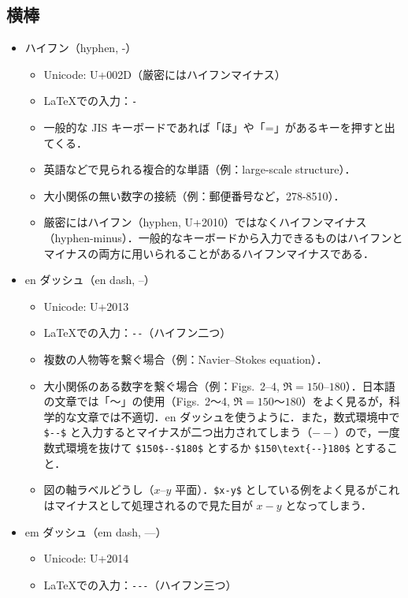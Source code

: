 \subsection*{横棒}

\begin{itemize}
    \item ハイフン（hyphen, -）
    \begin{itemize}
        \item Unicode: U+002D（厳密にはハイフンマイナス）
        \item \LaTeX での入力：\verb|-|
        \item 一般的な JIS キーボードであれば「ほ」や「=」があるキーを押すと出てくる．
        \item 英語などで見られる複合的な単語（例：large-scale structure）．
        \item 大小関係の無い数字の接続（例：郵便番号など，278-8510）．
        \item 厳密にはハイフン（hyphen, U+2010）ではなくハイフンマイナス（hyphen-minus）．一般的なキーボードから入力できるものはハイフンとマイナスの両方に用いられることがあるハイフンマイナスである．
    \end{itemize}
    \item en ダッシュ（en dash, --）
    \begin{itemize}
        \item Unicode: U+2013
        \item \LaTeX での入力：\verb|--|（ハイフン二つ）
        \item 複数の人物等を繋ぐ場合（例：Navier--Stokes equation）．
        \item 大小関係のある数字を繋ぐ場合（例：Figs.~2--4, $\Re = 150$--$180$）．日本語の文章では「～」の使用（Figs.~2～4, $\Re = 150$～$180$）をよく見るが，科学的な文章では不適切．en ダッシュを使うように．また，数式環境中で \verb|$--$| と入力するとマイナスが二つ出力されてしまう（$--$）ので，一度数式環境を抜けて \verb|$150$--$180$| とするか \verb|$150\text{--}180$| とすること．
        \item 図の軸ラベルどうし（$x$--$y$ 平面）．\verb|$x-y$| としている例をよく見るがこれはマイナスとして処理されるので見た目が $x-y$ となってしまう．
    \end{itemize}
    \item em ダッシュ（em dash, ---）
    \begin{itemize}
        \item Unicode: U+2014
        \item \LaTeX での入力：\verb|---|（ハイフン三つ）

\end{itemize}
\end{itemize}
